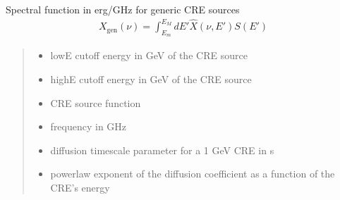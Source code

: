 \documentclass[letterpaper,10pt,english]{sphinxmanual}
\begin{document}

\begin{fulllineitems}
\label{\detokenize{diffsph.spectra:diffsph.spectra.synchrotron.X_gen}}
\pysigstartsignatures
{}
\pysigstopsignatures
\sphinxAtStartPar
Spectral function in erg/GHz for generic CRE sources
\begin{equation*}
\begin{split}X_\text{gen}(\nu) = \int_{E_m}^{E_M}dE'\hat X(\nu, E')S(E')\end{split}
\end{equation*}\begin{quote}\begin{description}
\begin{itemize}
\item {} 
\sphinxAtStartPar
{} \textendash{} low\sphinxhyphen{}E cutoff energy in GeV of the CRE source 

\item {} 
\sphinxAtStartPar
{} \textendash{} high\sphinxhyphen{}E cutoff energy in GeV of the CRE source 

\item {} 
\sphinxAtStartPar
{} \textendash{} CRE source function

\item {} 
\sphinxAtStartPar
{} \textendash{} frequency in GHz

\item {} 
\sphinxAtStartPar
{} \textendash{} diffusion time\sphinxhyphen{}scale parameter for a 1 GeV CRE in s

\item {} 
\sphinxAtStartPar
{} \textendash{} power\sphinxhyphen{}law exponent of the diffusion coefficient as a function of the CRE’s energy


\end{itemize}
\end{description}
\end{quote}
\end{fulllineitems}
\end{document}
